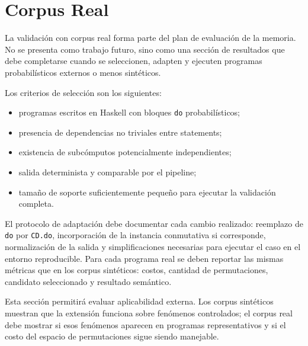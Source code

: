 
\section{Corpus Real}

La validación con corpus real forma parte del plan de evaluación de la memoria. No se presenta como trabajo futuro, sino como una sección de resultados que debe completarse cuando se seleccionen, adapten y ejecuten programas probabilísticos externos o menos sintéticos.

Los criterios de selección son los siguientes:

\begin{itemize}
    \item programas escritos en \textsf{Haskell} con bloques \texttt{do} probabilísticos;
    \item presencia de dependencias no triviales entre statements;
    \item existencia de subcómputos potencialmente independientes;
    \item salida determinista y comparable por el pipeline;
    \item tamaño de soporte suficientemente pequeño para ejecutar la validación completa.
\end{itemize}

El protocolo de adaptación debe documentar cada cambio realizado: reemplazo de \texttt{do} por \texttt{CD.do}, incorporación de la instancia conmutativa si corresponde, normalización de la salida y simplificaciones necesarias para ejecutar el caso en el entorno reproducible. Para cada programa real se deben reportar las mismas métricas que en los corpus sintéticos: costos, cantidad de permutaciones, candidato seleccionado y resultado semántico.

Esta sección permitirá evaluar aplicabilidad externa. Los corpus sintéticos muestran que la extensión funciona sobre fenómenos controlados; el corpus real debe mostrar si esos fenómenos aparecen en programas representativos y si el costo del espacio de permutaciones sigue siendo manejable.

